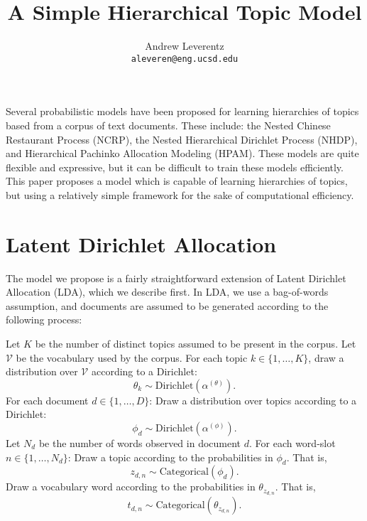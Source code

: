 \documentclass{article}
\title{A Simple Hierarchical Topic Model}
\author{
  Andrew Leverentz \\
  \texttt{aleveren@eng.ucsd.edu} \\
}
\date{}
\begin{document}
\maketitle



Several probabilistic models have been proposed for learning hierarchies of topics based from a corpus of text documents.
These include: the Nested Chinese Restaurant Process (NCRP), the Nested Hierarchical Dirichlet Process (NHDP), and Hierarchical Pachinko Allocation Modeling (HPAM).
These models are quite flexible and expressive, but it can be difficult to train these models efficiently.
This paper proposes a model which is capable of learning hierarchies of topics, but using a relatively simple framework for the sake of computational efficiency.

\section{Latent Dirichlet Allocation}

The model we propose is a fairly straightforward extension of Latent Dirichlet Allocation (LDA), which we describe first.
In LDA, we use a bag-of-words assumption, and documents are assumed to be generated according to the following process:
\begin{outline}
\1 Let $K$ be the number of distinct topics assumed to be present in the corpus.
\1 Let $\mathcal V$ be the vocabulary used by the corpus.
\1 For each topic $k \in \{1, \ldots, K\}$, draw a distribution over $\mathcal V$ according to a Dirichlet:
\[ \theta_k \sim \text{Dirichlet}(\alpha^{(\theta)}). \]
\1 For each document $d \in \{1, \ldots, D\}$:
  \2 Draw a distribution over topics according to a Dirichlet:
  \[ \phi_d \sim \text{Dirichlet}(\alpha^{(\phi)}). \]
  \2 Let $N_d$ be the number of words observed in document $d$.
  \2 For each word-slot $n \in \{1, \ldots, N_d\}$:
    \3 Draw a topic according to the probabilities in $\phi_d$.  That is,
    \[ z_{d,n} \sim \text{Categorical}(\phi_d). \]
    \3 Draw a vocabulary word according to the probabilities in $\theta_{z_{d,n}}$.  That is,
    \[ t_{d,n} \sim \text{Categorical}(\theta_{z_{d,n}}). \]
\end{outline}
\end{document}
